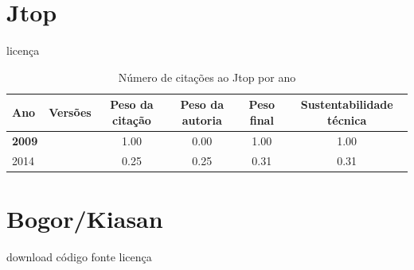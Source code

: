 \section{Jtop}
\checkmark licença


\begin{table}[H]
\caption{Número de citações ao Jtop por ano}
\centering
\begin{tabular}{| l | c | c | c | c | c |}
  \hline
  Ano & Versões & Peso da citação & Peso da autoria & Peso final & Sustentabilidade técnica \\
  \hline
            {\bf 2009}
          &
          
          &
          1.00
          &
          0.00
          &
          1.00
          &
            {\color{blue} 1.00}
          \\
\hline
            2014
          &
          
          &
          0.25
          &
          0.25
          &
          0.31
          &
            {\color{red} 0.31}
          \\
\hline
\end{tabular}
\end{table}



\section{Bogor/Kiasan}
\checkmark download
\checkmark código fonte
\checkmark licença


